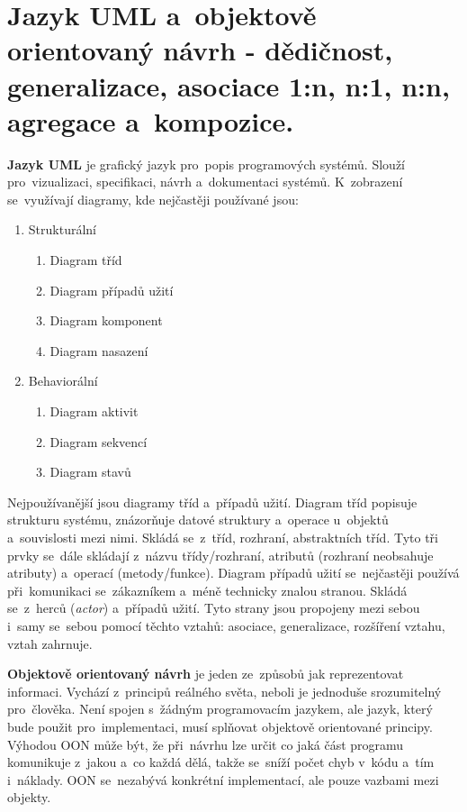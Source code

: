 \clearpage
\section{Jazyk UML a~objektově orientovaný návrh - dědičnost, generalizace, asociace 1:n, n:1, n:n, agregace a~kompozice.}

\textbf{Jazyk UML} je grafický jazyk pro~popis programových systémů. Slouží pro~vizualizaci, specifikaci, návrh a~dokumentaci systémů. K~zobrazení se~využívají diagramy, kde nejčastěji používané jsou:

\begin{enumerate}
	\item Strukturální
	      \begin{enumerate}
		      \item Diagram tříd
		      \item Diagram případů užití
		      \item Diagram komponent
		      \item Diagram nasazení
	      \end{enumerate}
	\item Behaviorální
	      \begin{enumerate}
		      \item Diagram aktivit
		      \item Diagram sekvencí
		      \item Diagram stavů
	      \end{enumerate}
\end{enumerate}

Nejpoužívanější jsou diagramy tříd a~případů užití. Diagram tříd popisuje strukturu systému, znázorňuje datové struktury a~operace u~objektů a~souvislosti mezi nimi. Skládá se~z~tříd, rozhraní, abstraktních tříd. Tyto tři prvky se~dále skládají z~názvu třídy/rozhraní, atributů (rozhraní neobsahuje atributy) a~operací (metody/funkce). Diagram případů užití se~nejčastěji používá při~komunikaci se~zákazníkem a~méně technicky znalou stranou. Skládá se~z~herců (\emph{actor}) a~případů užití. Tyto strany jsou propojeny mezi sebou i~samy se~sebou pomocí těchto vztahů: asociace, generalizace, rozšíření vztahu, vztah zahrnuje.

\textbf{Objektově orientovaný návrh} je jeden ze~způsobů jak reprezentovat informaci. Vychází z~principů reálného světa, neboli je jednoduše srozumitelný pro~člověka. Není spojen s~žádným programovacím jazykem, ale jazyk, který bude použit pro~implementaci, musí splňovat objektově orientované principy. Výhodou OON může být, že při~návrhu lze určit co jaká část programu komunikuje z~jakou a~co každá dělá, takže se~sníží počet chyb v~kódu a~tím i~náklady. OON se~nezabývá konkrétní implementací, ale pouze vazbami mezi objekty.

